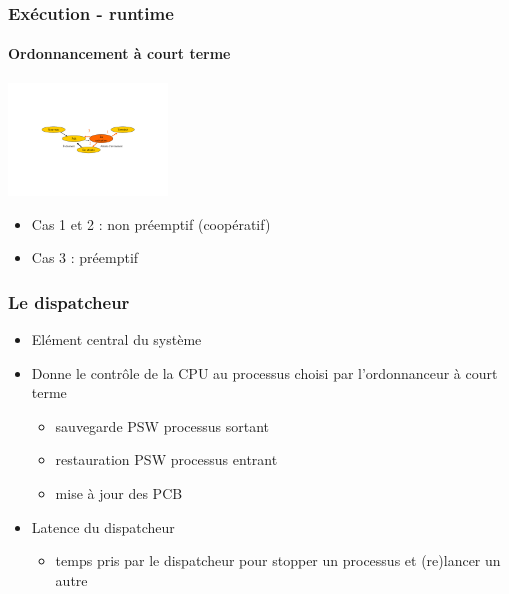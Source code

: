 \begin{frame}
 \frametitle{Exécution - runtime}
 \framesubtitle{Ordonnancement à court terme}

 \begin{center}
 \includegraphics[height=3cm]{../illustration/cycle_court_terme.pdf}
 \end{center}
 \begin{itemize}
 \item Cas 1 et 2 : non préemptif (coopératif)
 \item Cas 3 : préemptif
 \end{itemize}
\end{frame}



\begin{frame}
 \frametitle{Le dispatcheur}
 \begin{itemize}
 \item Elément central du système
 \item Donne le contrôle de la CPU au processus choisi par l’ordonnanceur à court terme
\begin{itemize}
\item sauvegarde PSW processus sortant
\item restauration PSW processus entrant
\item mise à jour des PCB
\end{itemize}
\item Latence du dispatcheur
	\begin{itemize}
\item temps pris par le dispatcheur pour stopper un processus et (re)lancer un autre
\end{itemize}

 \end{itemize}
\end{frame}


